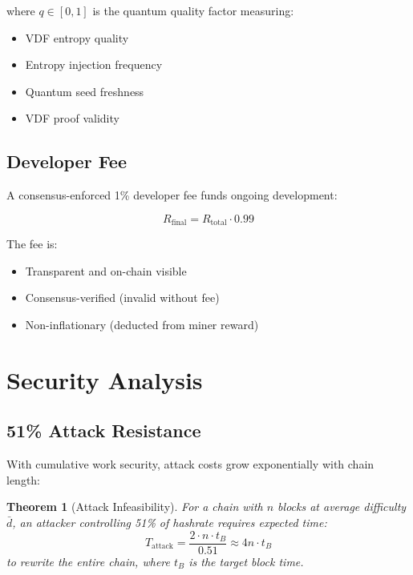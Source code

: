 \documentclass[11pt,a4paper]{article}
\newtheorem{theorem}{Theorem}[section]
\begin{document}
where $q \in [0, 1]$ is the quantum quality factor measuring:
\begin{itemize}
    \item VDF entropy quality
    \item Entropy injection frequency
    \item Quantum seed freshness
    \item VDF proof validity
\end{itemize}

\subsection{Developer Fee}

A consensus-enforced 1\% developer fee funds ongoing development:

\begin{equation}
    R_{\text{final}} = R_{\text{total}} \cdot 0.99
\end{equation}

The fee is:
\begin{itemize}
    \item Transparent and on-chain visible
    \item Consensus-verified (invalid without fee)
    \item Non-inflationary (deducted from miner reward)
\end{itemize}

\section{Security Analysis}

\subsection{51\% Attack Resistance}

With cumulative work security, attack costs grow exponentially with chain length:

\begin{theorem}[Attack Infeasibility]
For a chain with $n$ blocks at average difficulty $\bar{d}$, an attacker controlling 51\% of hashrate requires expected time:
\begin{equation}
    T_{\text{attack}} = \frac{2 \cdot n \cdot t_B}{0.51} \approx 4n \cdot t_B
\end{equation}
to rewrite the entire chain, where $t_B$ is the target block time.
\end{theorem}
\end{document}
